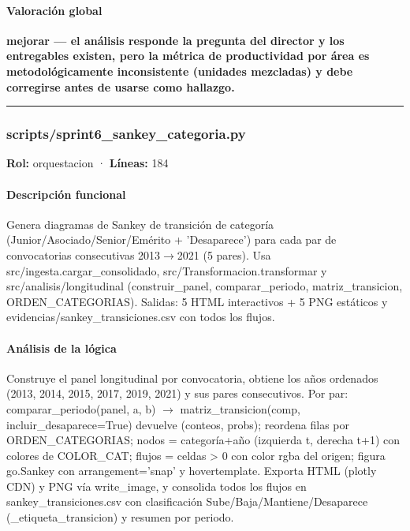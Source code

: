 \paragraph{Valoración global}
\textbf{mejorar --- el análisis responde la pregunta del director y los entregables existen, pero la métrica de productividad por área es metodológicamente inconsistente (unidades mezcladas) y debe corregirse antes de usarse como hallazgo.}

\medskip
\hrule

\subsubsection{scripts/sprint6\_sankey\_categoria.py}
\textbf{Rol:} orquestacion · \textbf{Líneas:} 184

\paragraph{Descripción funcional}
Genera diagramas de Sankey de transición de categoría (Junior/Asociado/Senior/Emérito + 'Desaparece') para cada par de convocatorias consecutivas 2013$\rightarrow$2021 (5 pares). Usa src/ingesta.cargar\_consolidado, src/Transformacion.transformar y src/analisis/longitudinal (construir\_panel, comparar\_periodo, matriz\_transicion, ORDEN\_CATEGORIAS). Salidas: 5 HTML interactivos + 5 PNG estáticos y evidencias/sankey\_transiciones.csv con todos los flujos.

\paragraph{Análisis de la lógica}
Construye el panel longitudinal por convocatoria, obtiene los años ordenados (2013, 2014, 2015, 2017, 2019, 2021) y sus pares consecutivos. Por par: comparar\_periodo(panel, a, b) $\rightarrow$ matriz\_transicion(comp, incluir\_desaparece=True) devuelve (conteos, probs); reordena filas por ORDEN\_CATEGORIAS; nodos = categoría+año (izquierda t, derecha t+1) con colores de COLOR\_CAT; flujos = celdas > 0 con color rgba del origen; figura go.Sankey con arrangement='snap' y hovertemplate. Exporta HTML (plotly CDN) y PNG vía write\_image, y consolida todos los flujos en sankey\_transiciones.csv con clasificación Sube/Baja/Mantiene/Desaparece (\_etiqueta\_transicion) y resumen por periodo.

